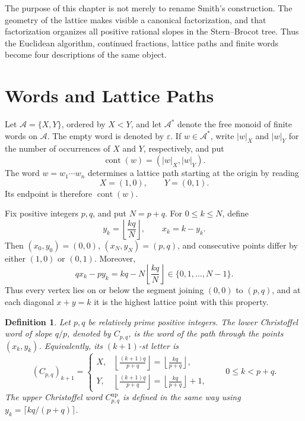 \documentclass{book}
\newtheorem{definition}{Definition}[section]
\begin{document}
The purpose of this chapter is not merely to rename Smith's construction.
The geometry of the lattice makes visible a canonical factorization, and
that factorization organizes all positive rational slopes in the
Stern--Brocot tree.  Thus the Euclidean algorithm, continued fractions,
lattice paths and finite words become four descriptions of the same
object.

\section{Words and Lattice Paths}

Let \(\mathcal A=\{X,Y\}\), ordered by \(X<Y\), and let
\(\mathcal A^*\) denote the free monoid of finite words on \(\mathcal A\).
The empty word is denoted by \(\varepsilon\).  If \(w\in\mathcal A^*\),
write \(|w|_X\) and \(|w|_Y\) for the number of occurrences of \(X\) and
\(Y\), respectively, and put
\[
  \operatorname{cont}(w)=(|w|_X,|w|_Y).
\]
The word \(w=w_1\cdots w_n\) determines a lattice path starting at the
origin by reading
\[
  X=(1,0),\qquad Y=(0,1).
\]
Its endpoint is therefore \(\operatorname{cont}(w)\).

Fix positive integers \(p,q\), and put \(N=p+q\).  For
\(0\leq k\leq N\), define
\[
  y_k=\left\lfloor\frac{kq}{N}\right\rfloor,
  \qquad x_k=k-y_k.
\]
Then \((x_0,y_0)=(0,0)\), \((x_N,y_N)=(p,q)\), and consecutive points
differ by either \((1,0)\) or \((0,1)\).  Moreover,
\begin{equation}\label{eq:ChristoffelHeight}
  qx_k-py_k=kq-N\left\lfloor\frac{kq}{N}\right\rfloor
  \in\{0,1,\ldots,N-1\}.
\end{equation}
Thus every vertex lies on or below the segment joining \((0,0)\) to
\((p,q)\), and at each diagonal \(x+y=k\) it is the highest lattice point
with this property.

\begin{definition}\label{definition:LowerChristoffel}
  Let \(p,q\) be relatively prime positive integers.  The
  \textnormal{lower Christoffel word} of slope \(q/p\), denoted by
  \(C_{p,q}\), is the word of the path through the points
  \((x_k,y_k)\).  Equivalently, its \((k+1)\)-st letter is
  \begin{equation}\label{eq:ChristoffelMechanicalDefinition}
    (C_{p,q})_{k+1}=
    \begin{cases}
      X,&\displaystyle
      \left\lfloor\frac{(k+1)q}{p+q}\right\rfloor
      =\left\lfloor\frac{kq}{p+q}\right\rfloor,\\[6pt]
      Y,&\displaystyle
      \left\lfloor\frac{(k+1)q}{p+q}\right\rfloor
      =\left\lfloor\frac{kq}{p+q}\right\rfloor+1,
    \end{cases}
    \qquad 0\leq k<p+q.
  \end{equation}
  The \textnormal{upper Christoffel word} \(C^{\mathrm{up}}_{p,q}\) is
  defined in the same way using
  \(y_k=\lceil kq/(p+q)\rceil\).
\end{definition}
\end{document}
